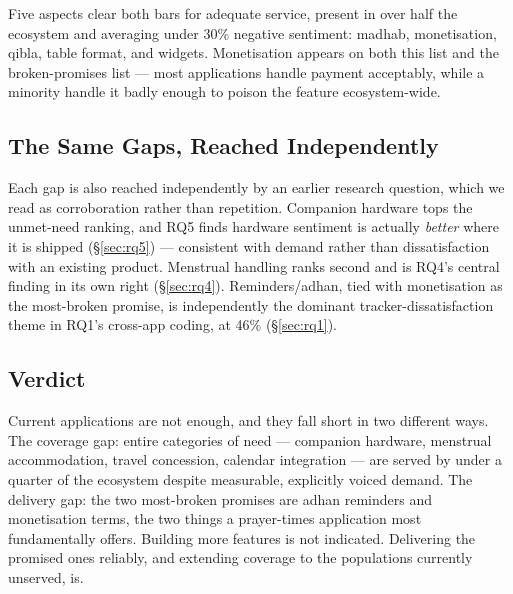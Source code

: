 Five aspects clear both bars for adequate service, present in over half the
ecosystem and averaging under 30\% negative sentiment: madhab, monetisation,
qibla, table format, and widgets. Monetisation appears on both this list and
the broken-promises list --- most applications handle payment acceptably,
while a minority handle it badly enough to poison the feature ecosystem-wide.

\subsection{The Same Gaps, Reached Independently}

Each gap is also reached independently by an earlier research question, which
we read as corroboration rather than repetition. Companion hardware tops the
unmet-need ranking, and RQ5 finds hardware sentiment is actually
\emph{better} where it is shipped (\S\ref{sec:rq5}) --- consistent with demand
rather than dissatisfaction with an existing product. Menstrual handling ranks
second and is RQ4's central finding in its own right (\S\ref{sec:rq4}).
Reminders/adhan, tied with monetisation as the most-broken promise, is
independently the dominant tracker-dissatisfaction theme in RQ1's cross-app
coding, at 46\% (\S\ref{sec:rq1}).

\subsection{Verdict}

Current applications are not enough, and they fall short in two different
ways. The coverage gap: entire categories of need --- companion hardware,
menstrual accommodation, travel concession, calendar integration --- are
served by under a quarter of the ecosystem despite measurable, explicitly
voiced demand. The delivery gap: the two most-broken promises are adhan
reminders and monetisation terms, the two things a prayer-times application
most fundamentally offers. Building more features is not indicated. Delivering
the promised ones reliably, and extending coverage to the populations
currently unserved, is.
